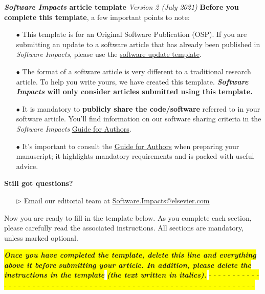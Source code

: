 \documentclass[11pt, letterpaper]{article}
\begin{document}
\noindent
{\Large {\textbf{\textit {Software Impacts} article template}}} \textit{Version 2 (July 2021)}
\vskip0.5cm
\noindent
\textbf{Before you complete this template}, a few important points to note:
\begin{itemize}
\item[$\bullet$]{This template is for an Original Software Publication (OSP). If you are submitting an update to a software article that has already been published in \textit{Software Impacts}, please use the \underline{software update template}.}
\item[$\bullet$]{The format of a software article is very different to a traditional research article. To help you write yours, we have created this template. \textbf{\textit{Software Impacts} will only consider articles submitted using this template.}}
\item[$\bullet$]{It is mandatory to {\bf publicly share the code/software} referred to in your software article. You’ll find information on our software sharing criteria in the \textit{Software Impacts} \href{https://www.elsevier.com/journals/software-impacts/2665-9638/guide-for-authors}{\underline{Guide for Authors}}.}  
\item[$\bullet$]{It’s important to consult the \href{https://www.elsevier.com/journals/software-impacts/2665-9638/guide-for-authors}{\underline{Guide for Authors}} when preparing your manuscript; it highlights mandatory requirements and is packed with useful advice.}
\end{itemize}
\vskip0.5cm
\noindent
\textbf{Still got questions?}
\begin{itemize}
\item[$\triangleright$]{Email our editorial team at \href{mailto:Software.Impacts@elsevier.com}{\underline{Software.Impacts@elsevier.com}}}
\end{itemize}

\noindent
Now you are ready to fill in the template below. As you complete each section, please carefully read the associated instructions. All sections are mandatory, unless marked optional.\newline
\vskip0.5cm
\begin{center}
\colorbox{yellow}{\textbf{ \textit{ Once you have completed the template, delete this line and everything above it before} }}
\colorbox{yellow}{\textbf{ \textit{ submitting your article. In addition, please delete the instructions in the template}}} 
\colorbox{yellow}{\textbf{ \textit{  (the text written in italics).}}}
\colorbox{yellow}{- - - - - - - - - - - - - - - - - - - - - - - - - - - - - - - - - - - - - - - - - - - - - - - - - - - - - - - - - - - - - - - - }
\end{center}
\end{document}
